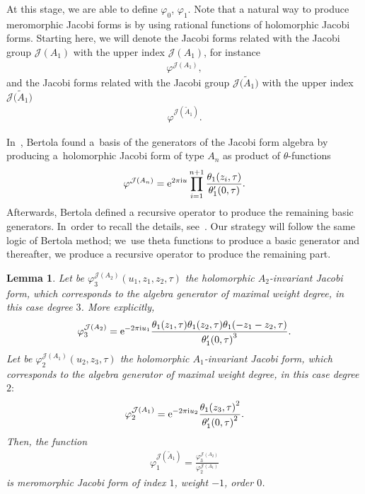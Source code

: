\documentclass[pdftex]{sigma}%
\numberwithin{equation}{section}
\newtheorem{Lemma}[Theorem]{Lemma}
\newcommand{\Ja}{\mathcal{J}}
\begin{document}
At this stage, we are able to define $\varphi_0$, $\varphi_1$. Note that a natural way to produce meromorphic Jacobi forms is by using rational functions of holomorphic Jacobi forms. Starting here, we will denote the Jacobi forms related with the Jacobi group $\Ja(A_1)$ with the upper index $\Ja(A_1)$, for instance
\begin{gather*}
\varphi^{\Ja(A_1)},
\end{gather*}
and the Jacobi forms related with the Jacobi group $\Ja\big(\tilde A_1\big)$ with the upper index $\Ja\big(\tilde A_1\big)$
\begin{gather*}
\varphi^{\Ja(\tilde A_1)}.
\end{gather*}

In~\cite{BertolaM.1}, Bertola found a~basis of the generators of the Jacobi form algebra by producing a~holomorphic Jacobi form of type $A_n$ as product of $\theta$-functions
\begin{gather*}
\varphi^{\Ja(A_n)}={\rm e}^{2\pi {\rm i} u}\prod_{i=1}^{n+1} \frac{\theta_1(z_i,\tau)}{\theta_1^{\prime}(0,\tau)}.
\end{gather*}
Afterwards, Bertola defined a recursive operator to produce the remaining basic generators. In~order to recall the details, see~\cite{BertolaM.1}. Our strategy will follow the same logic of Bertola method; we~use theta functions to produce a basic generator and thereafter, we produce a recursive operator to produce the remaining part.

\begin{Lemma}
 Let be $\varphi_3^{\Ja(A_2)}(u_1,z_1,z_2,\tau)$ the holomorphic $A_2$-invariant Jacobi form, which corresponds to the algebra generator of maximal weight degree, in this case degree $3$. More exp\-li\-citly,
\begin{gather*}
\varphi_3^{\Ja(A_2)}={\rm e}^{-2\pi {\rm i} u_1}\frac{\theta_1(z_1,\tau)\theta_1(z_2,\tau)\theta_1(-z_1-z_2,\tau)}{{\theta_1^{\prime}(0,\tau)}^3}.
\end{gather*}
Let be $\varphi_2^{\Ja(A_1)}(u_2,z_3,\tau)$ the holomorphic $A_1$-invariant Jacobi form, which corresponds to the algebra generator of maximal weight degree, in this case degree $2{:}$
\begin{gather*}
\varphi_2^{\Ja(A_1)}={\rm e}^{-2\pi {\rm i} u_2}\frac{{\theta_1(z_3,\tau)}^2}{{\theta_1^{\prime}(0,\tau)}^2}.
\end{gather*}
Then, the function
\begin{gather}\label{varphi1 def Jtildea1}
\varphi_1^{\Ja(\tilde A_1)}=\frac{\varphi_3^{\Ja(A_2)}}{\varphi_2^{\Ja(A_1)}}
\end{gather}
is meromorphic Jacobi form of index $1$, weight $-1$, order $0$.
\end{Lemma}
\end{document}
